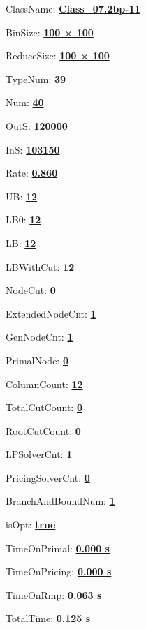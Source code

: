 \documentclass[11pt]{article}
\begin{document}
\pagestyle{empty}


ClassName: \underline{\textbf{Class_07.2bp-11}}
\par
BinSize: \underline{\textbf{100 × 100}}
\par
ReduceSize: \underline{\textbf{100 × 100}}
\par
TypeNum: \underline{\textbf{39}}
\par
Num: \underline{\textbf{40}}
\par
OutS: \underline{\textbf{120000}}
\par
InS: \underline{\textbf{103150}}
\par
Rate: \underline{\textbf{0.860}}
\par
UB: \underline{\textbf{12}}
\par
LB0: \underline{\textbf{12}}
\par
LB: \underline{\textbf{12}}
\par
LBWithCut: \underline{\textbf{12}}
\par
NodeCut: \underline{\textbf{0}}
\par
ExtendedNodeCnt: \underline{\textbf{1}}
\par
GenNodeCnt: \underline{\textbf{1}}
\par
PrimalNode: \underline{\textbf{0}}
\par
ColumnCount: \underline{\textbf{12}}
\par
TotalCutCount: \underline{\textbf{0}}
\par
RootCutCount: \underline{\textbf{0}}
\par
LPSolverCnt: \underline{\textbf{1}}
\par
PricingSolverCnt: \underline{\textbf{0}}
\par
BranchAndBoundNum: \underline{\textbf{1}}
\par
isOpt: \underline{\textbf{true}}
\par
TimeOnPrimal: \underline{\textbf{0.000 s}}
\par
TimeOnPricing: \underline{\textbf{0.000 s}}
\par
TimeOnRmp: \underline{\textbf{0.063 s}}
\par
TotalTime: \underline{\textbf{0.125 s}}
\par
\newpage


\end{document}
